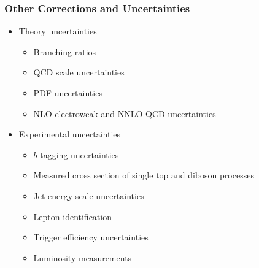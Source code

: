 \documentclass{beamer}
\begin{document}
\begin{frame}
  \frametitle{Other Corrections and Uncertainties}

  \begin{itemize}
  \item Theory uncertainties
    \begin{itemize}
    \item Branching ratios
    \item QCD scale uncertainties
    \item PDF uncertainties
    \item NLO electroweak and NNLO QCD uncertainties
    \end{itemize}
  \item Experimental uncertainties
    \begin{itemize}
    \item $b$-tagging uncertainties
    \item Measured cross section of single top and diboson processes
    \item Jet energy scale uncertainties
    \item Lepton identification
    \item Trigger efficiency uncertainties
    \item Luminosity measurements
    \end{itemize}
  \end{itemize}

\end{frame}
\end{document}
